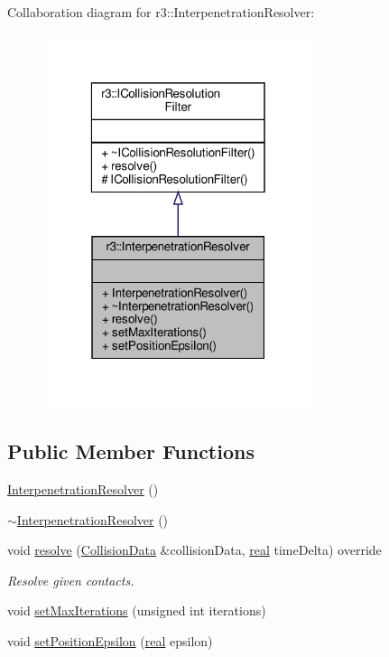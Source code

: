 Collaboration diagram for r3\+:\+:Interpenetration\+Resolver\+:\nopagebreak
\begin{figure}[H]
\begin{center}
\leavevmode
\includegraphics[width=224pt]{classr3_1_1_interpenetration_resolver__coll__graph}
\end{center}
\end{figure}
\subsection*{Public Member Functions}
\begin{DoxyCompactItemize}
\item 
\mbox{\hyperlink{classr3_1_1_interpenetration_resolver_a6a739e8121bba89238f0db2a573eb272}{Interpenetration\+Resolver}} ()
\item 
\mbox{\hyperlink{classr3_1_1_interpenetration_resolver_a2c0f47fd620356e06fb9e16387b7e83b}{$\sim$\+Interpenetration\+Resolver}} ()
\item 
void \mbox{\hyperlink{classr3_1_1_interpenetration_resolver_a7c896a7e8e0321c9f26b3d9c616d16ee}{resolve}} (\mbox{\hyperlink{classr3_1_1_collision_data}{Collision\+Data}} \&collision\+Data, \mbox{\hyperlink{namespacer3_ab2016b3e3f743fb735afce242f0dc1eb}{real}} time\+Delta) override
\begin{DoxyCompactList}\small\item\em Resolve given contacts. \end{DoxyCompactList}\item 
void \mbox{\hyperlink{classr3_1_1_interpenetration_resolver_a8250baac4ce0ed634002ed3be4515519}{set\+Max\+Iterations}} (unsigned int iterations)
\item 
void \mbox{\hyperlink{classr3_1_1_interpenetration_resolver_ad70802061f5f8868622cc5024a10f8cf}{set\+Position\+Epsilon}} (\mbox{\hyperlink{namespacer3_ab2016b3e3f743fb735afce242f0dc1eb}{real}} epsilon)
\end{DoxyCompactItemize}
